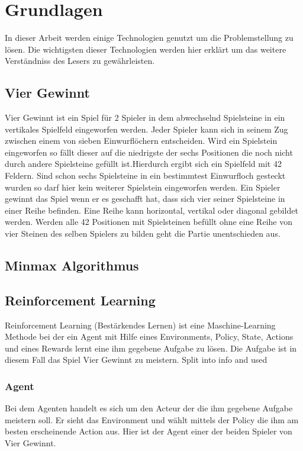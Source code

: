 \chapter{Grundlagen}%

\label{cha:Schluss}

In dieser Arbeit werden einige Technologien genutzt um die Problemstellung zu lösen.
Die wichtigsten dieser Technologien werden hier erklärt um das weitere Verständniss des Lesers zu gewährleisten. 


\section{Vier Gewinnt}
Vier Gewinnt ist ein Spiel für 2 Spieler in dem abwechselnd Spielsteine in ein vertikales Spielfeld eingeworfen werden. Jeder Spieler kann sich in seinem Zug zwischen einem von sieben Einwurflöchern entscheiden. Wird ein Spielstein eingeworfen so fällt dieser auf die niedrigste der sechs Positionen die noch nicht durch andere Spielsteine gefüllt ist.Hierdurch ergibt sich ein Spielfeld mit 42 Feldern.  Sind schon sechs Spielsteine in ein bestimmtest Einwurfloch gesteckt wurden so darf hier kein weiterer Spielstein eingeworfen werden. Ein Spieler gewinnt das Spiel wenn er es geschafft  hat, dass sich vier seiner Spielsteine in einer Reihe befinden. Eine Reihe kann horizontal, vertikal oder diagonal gebildet werden. Werden alle 42 Positionen mit Spielsteinen befüllt ohne eine Reihe von vier Steinen des selben Spielers zu bilden geht die Partie unentschieden aus.


\section{Minmax Algorithmus}

\section{Reinforcement Learning}
Reinforcement Learning (Bestärkendes Lernen) ist eine Maschine-Learning Methode bei der ein Agent mit Hilfe eines Environments, Policy, State, Actions und eines Rewards lernt eine ihm gegebene Aufgabe zu lösen.
Die Aufgabe ist in diesem Fall das Spiel Vier Gewinnt zu meistern.
\colorbox{red!30}{Split into info and used} %

\subsection{Agent}
Bei dem Agenten handelt es sich um den Acteur der die ihm gegebene Aufgabe meistern soll. Er sieht das Environment und wählt mittels der Policy die ihm am besten erscheinende Action aus.
Hier ist der Agent einer der beiden Spieler von Vier Gewinnt.

